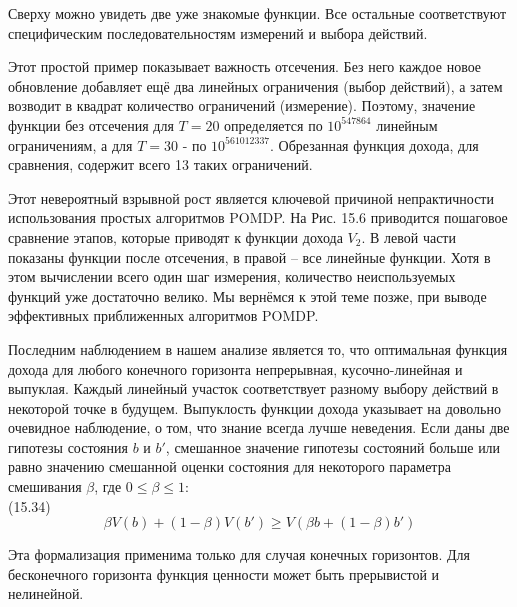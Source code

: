 \documentclass[10pt,a4paper]{article}
\begin{document}
Сверху можно увидеть две уже знакомые функции. Все остальные соответствуют специфическим последовательностям измерений и выбора действий.

Этот простой пример показывает важность отсечения. Без него каждое новое обновление добавляет ещё два линейных ограничения (выбор действий), а затем возводит в квадрат количество ограничений (измерение). Поэтому, значение функции без отсечения  для $T = 20$ определяется по $10^{547864}$ линейным ограничениям, а для $T = 30$ - по $10^{561012337}$. Обрезанная функция дохода, для сравнения, содержит всего 13 таких ограничений.

Этот невероятный взрывной рост является ключевой причиной непрактичности использования простых алгоритмов POMDP. На Рис. 15.6 приводится пошаговое сравнение этапов, которые приводят к функции дохода $V_2$. В левой части показаны функции после отсечения, в правой – все линейные функции. Хотя в этом вычислении всего один шаг измерения, количество неиспользуемых функций уже достаточно велико. Мы вернёмся к этой теме позже, при выводе эффективных приближенных алгоритмов POMDP.

Последним наблюдением в нашем анализе является то, что оптимальная функция дохода для любого конечного горизонта непрерывная, кусочно-линейная и выпуклая. Каждый линейный участок соответствует разному выбору действий в некоторой точке в будущем. Выпуклость функции дохода указывает на довольно очевидное наблюдение, о том, что знание всегда лучше неведения. Если даны две гипотезы состояния $b$ и $b'$, смешанное значение гипотезы состояний больше или равно значению смешанной оценки состояния для некоторого параметра смешивания $\beta$, где $0\leq\beta\leq1$:\\

(15.34)
$$\beta V(b)+(1-\beta)V(b')\geq V(\beta b+(1-\beta)b')$$

Эта формализация применима только для случая конечных горизонтов. Для бесконечного горизонта функция ценности может быть прерывистой и нелинейной.\\
\end{document}
